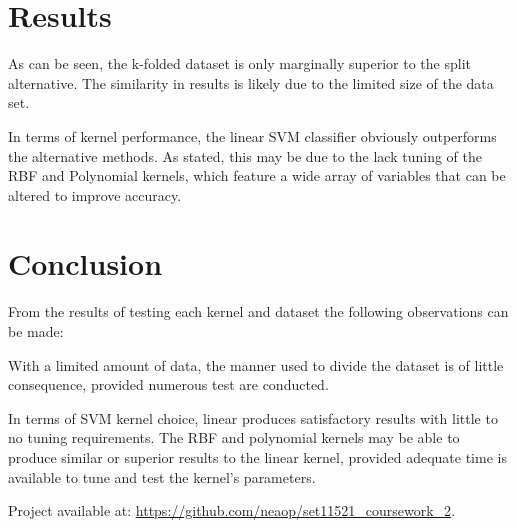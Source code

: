 \documentclass[twocolumn]{article}
\begin{document}
\section{Results}
As can be seen, the k-folded dataset is only marginally superior to the split
alternative.
The similarity in results is likely due to the limited size of the data set.

In terms of kernel performance, the linear SVM classifier obviously
outperforms the alternative methods.
As stated, this may be due to the lack tuning of the RBF and Polynomial
kernels, which feature a wide array of variables that can be altered to
improve accuracy.


\section{Conclusion}
From the results of testing each kernel and dataset the following observations
can be made:

With a limited amount of data, the manner used to divide the dataset is of
little consequence, provided numerous test are conducted.

In terms of SVM kernel choice, linear produces satisfactory results with little
to no tuning requirements.
The RBF and polynomial kernels may be able to produce similar or superior
results to the linear kernel, provided adequate time is available to tune
and test the kernel's parameters.

\noindent
Project available at: \url{https://github.com/neaop/set11521_coursework_2}.



\end{document}
